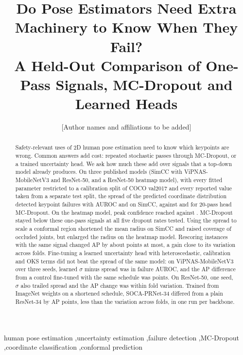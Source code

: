 \documentclass[preprint,11pt]{elsarticle}
\begin{document}
\begin{frontmatter}

\title{Do Pose Estimators Need Extra Machinery to Know When They Fail?\\
A Held-Out Comparison of One-Pass Signals, MC-Dropout and Learned Heads}

\author{[Author names and affiliations to be added]}

\begin{abstract}
Safety-relevant uses of 2D human pose estimation need to know which keypoints are wrong.
Common answers add cost: repeated stochastic passes through MC-Dropout, or a trained
uncertainty head. We ask how much these add over signals that a top-down model already
produces. On three published models (SimCC with ViPNAS-MobileNetV3 and ResNet-50, and a
ResNet-50 heatmap model), with every fitted parameter restricted to a calibration split of
COCO val2017 and every reported value taken from a separate test split, the spread of the
predicted coordinate distribution detected keypoint failures with AUROC \FaZsSimccMbvThreeDist{}
and \FaZsSimccRFiveZeroDist{} on SimCC, against \FaZsSimccMbvThreeMcSoft{} and
\FaZsSimccRFiveZeroMcSoft{} for 20-pass head MC-Dropout. On the heatmap model, peak confidence
reached \FaZsHmRFiveZeroConf{} against \FaZsHmRFiveZeroMcSoft{}. MC-Dropout stayed below these
one-pass signals at all five dropout rates tested. Using the spread to scale a conformal
region shortened the mean radius on SimCC and raised coverage of occluded joints, but enlarged
the radius on the heatmap model. Rescoring instances with the same signal changed AP by about
\DapZsSimccRFiveZeroExpAlphaDist{} points at most, a gain close to its variation across folds.
Fine-tuning a learned uncertainty head with heteroscedastic, calibration and OKS terms did not beat the
spread of the same model: on ViPNAS-MobileNetV3 over three seeds, learned $\sigma$ minus spread was
\SeedDfaHetMinusDist{} in failure AUROC, and the AP difference from a control fine-tuned with the same
schedule was \SeedDapGt{} points. On ResNet-50, one seed, $\sigma$ also trailed spread and the AP change
was within fold variation.
Trained from ImageNet weights on a shortened schedule, SOCA-PRNet-34 differed from a plain ResNet-34 by
\DapGtImSocaBaseSZero{} AP points, less than the variation across folds, in one run per backbone.
\end{abstract}

\begin{keyword}
human pose estimation \sep uncertainty estimation \sep failure detection \sep MC-Dropout
\sep coordinate classification \sep conformal prediction
\end{keyword}
\end{frontmatter}
\end{document}
